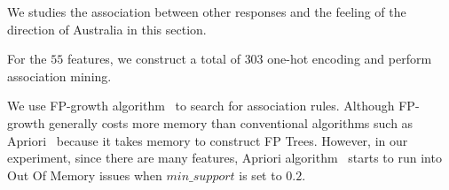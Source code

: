 \documentclass[11pt,twocolumn,letterpaper]{article}
\begin{document}
We studies the association between other responses and the feeling of the direction of Australia in this section.

For the $55$ features, we construct a total of $303$ one-hot encoding and perform association mining.

We use FP-growth algorithm~\cite{fpgrowth} to search for association rules.
Although FP-growth generally costs more memory than conventional algorithms such as Apriori~\cite{apriori} because it takes memory to construct FP Trees.
However, in our experiment, since there are many features, Apriori algorithm~\cite{apriori} starts to run into Out Of Memory issues when $min\_support$ is set to $0.2$.

\begin{table}[htb!]
\vspace{-1mm}
    \caption{Antecedents of consequents $A2$, with a $min\_support$ of 0.55 and a $min\_confidence$ of 0.61. $a support$ refers to support of antecedents, $c support$ refers to support of consequents, and $ud\_voter\_F$ refers to $undecided\_voter=False$.}
\label{tab:direction}\vspace{-3mm}
\end{table}
\end{document}
